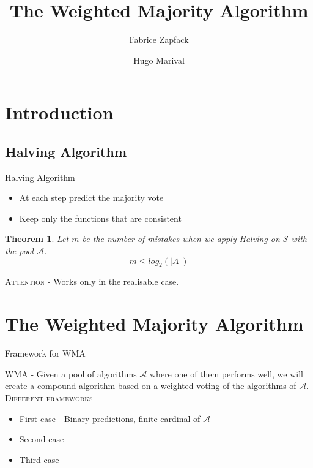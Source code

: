 \documentclass{beamer}
\title{The Weighted Majority Algorithm}
\author{Fabrice Zapfack 
\and Hugo Marival}
\date{\mydate}
\newtheorem{Th}{Theorem}
\begin{document}
	\begin{frame}[label=titre]
		\titlepage
	\end{frame}
	
	\section{Introduction}
		\subsection{Halving Algorithm}
			\begin{frame}{Halving Algorithm}

				  
				\begin{itemize}
				\item At each step predict the majority vote
				\item Keep only the functions that are consistent
				\end{itemize}
				\begin{Th}
					Let $m$ be the number of mistakes when we apply Halving on $\mathcal{S}$ with the pool $\mathcal{A}$.
					\[m \leq log_2(|A|)\]
				\end{Th}
				\textsc{Attention} - Works only in the realisable case. \newline\newline
			\end{frame}

			

	\section{The Weighted Majority Algorithm}
	
\begin{frame}{Framework for WMA}

\textsc{WMA} - Given a pool of algorithms $\mathcal{A}$ where one of them performs well, we will create a compound algorithm based on a weighted voting of the algorithms of $\mathcal{A}$. \newline\newline
\textsc{Different frameworks}  
\begin{itemize}
\item First case - Binary predictions, finite cardinal of $\mathcal{A}$
\item Second case - 
\item Third case
\end{itemize}

\end{frame}
\end{document}
